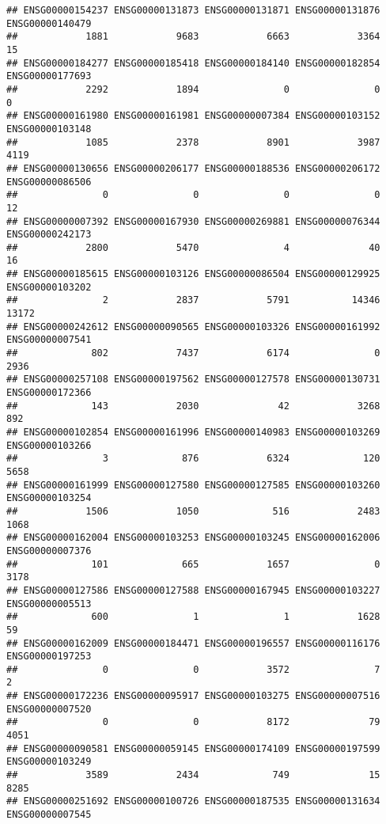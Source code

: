 \documentclass[
]{article}
\begin{document}
\begin{verbatim}
## ENSG00000154237 ENSG00000131873 ENSG00000131871 ENSG00000131876 ENSG00000140479 
##            1881            9683            6663            3364              15 
## ENSG00000184277 ENSG00000185418 ENSG00000184140 ENSG00000182854 ENSG00000177693 
##            2292            1894               0               0               0 
## ENSG00000161980 ENSG00000161981 ENSG00000007384 ENSG00000103152 ENSG00000103148 
##            1085            2378            8901            3987            4119 
## ENSG00000130656 ENSG00000206177 ENSG00000188536 ENSG00000206172 ENSG00000086506 
##               0               0               0               0              12 
## ENSG00000007392 ENSG00000167930 ENSG00000269881 ENSG00000076344 ENSG00000242173 
##            2800            5470               4              40              16 
## ENSG00000185615 ENSG00000103126 ENSG00000086504 ENSG00000129925 ENSG00000103202 
##               2            2837            5791           14346           13172 
## ENSG00000242612 ENSG00000090565 ENSG00000103326 ENSG00000161992 ENSG00000007541 
##             802            7437            6174               0            2936 
## ENSG00000257108 ENSG00000197562 ENSG00000127578 ENSG00000130731 ENSG00000172366 
##             143            2030              42            3268             892 
## ENSG00000102854 ENSG00000161996 ENSG00000140983 ENSG00000103269 ENSG00000103266 
##               3             876            6324             120            5658 
## ENSG00000161999 ENSG00000127580 ENSG00000127585 ENSG00000103260 ENSG00000103254 
##            1506            1050             516            2483            1068 
## ENSG00000162004 ENSG00000103253 ENSG00000103245 ENSG00000162006 ENSG00000007376 
##             101             665            1657               0            3178 
## ENSG00000127586 ENSG00000127588 ENSG00000167945 ENSG00000103227 ENSG00000005513 
##             600               1               1            1628              59 
## ENSG00000162009 ENSG00000184471 ENSG00000196557 ENSG00000116176 ENSG00000197253 
##               0               0            3572               7               2 
## ENSG00000172236 ENSG00000095917 ENSG00000103275 ENSG00000007516 ENSG00000007520 
##               0               0            8172              79            4051 
## ENSG00000090581 ENSG00000059145 ENSG00000174109 ENSG00000197599 ENSG00000103249 
##            3589            2434             749              15            8285 
## ENSG00000251692 ENSG00000100726 ENSG00000187535 ENSG00000131634 ENSG00000007545 

\end{verbatim}
\end{document}
